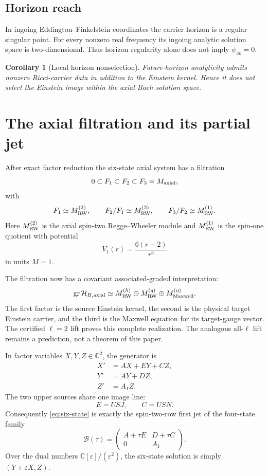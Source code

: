 \documentclass[11pt]{article}
\newtheorem{corollary}[theorem]{Corollary}
\theoremstyle{definition}
\theoremstyle{remark}
\newcommand{\C}{\mathbb C}
\begin{document}
\subsection{Horizon reach}

In ingoing Eddington--Finkelstein coordinates the carrier horizon is a regular
singular point.  For every nonzero real frequency its ingoing analytic
solution space is two-dimensional.  Thus horizon regularity alone does not
imply \(\psi_{ab}=0\).

\begin{corollary}[Local horizon nonselection]
Future-horizon analyticity admits nonzero Ricci-carrier data in addition to
the Einstein kernel.  Hence it does not select the Einstein image within the
axial Bach solution space.
\end{corollary}

\section{The axial filtration and its partial jet}
\label{sec:jet}

After exact factor reduction the six-state axial system has a filtration
\[
0\subset F_1\subset F_2\subset F_3=M_{\rm axial},
\]
with
\begin{equation}
\label{eq:filtration}
F_1\simeq M_{\rm RW}^{(2)},\qquad
F_2/F_1\simeq M_{\rm RW}^{(2)},\qquad
F_3/F_2\simeq M_{\rm RW}^{(1)}.
\end{equation}
Here \(M_{\rm RW}^{(2)}\) is the axial spin-two Regge--Wheeler module and
\(M_{\rm RW}^{(1)}\) is the spin-one quotient with potential
\[
V_1(r)=\frac{6(r-2)}{r^3}
\]
in units \(M=1\).

The filtration now has a covariant associated-graded interpretation:
\[
\operatorname{gr}\mathcal H_{B,\rm axial}
\simeq
M_{\rm RW}^{(h)}
\oplus M_{\rm RW}^{(q)}
\oplus M_{\rm Maxwell}^{(\eta)}.
\]
The first factor is the source Einstein kernel, the second is the physical
target Einstein carrier, and the third is the Maxwell equation for its
target-gauge vector.  The certified \(\ell=2\) lift proves this complete
realization.  The analogous all-\(\ell\) lift remains a prediction, not a
theorem of this paper.

In factor variables \(X,Y,Z\in\C^2\), the generator is
\begin{equation}
\label{eq:six-state}
\begin{aligned}
X'&=AX+EY+CZ,\\
Y'&=AY+DZ,\\
Z'&=A_1Z.
\end{aligned}
\end{equation}
The two upper sources share one image line:
\[
E=USJ,\qquad C=USN.
\]
Consequently \eqref{eq:six-state} is exactly the spin-two-row first jet of
the four-state family
\begin{equation}
\label{eq:four-state}
\mathcal B(\tau)=
\begin{pmatrix}
A+\tau E&D+\tau C\\
0&A_1
\end{pmatrix}.
\end{equation}
Over the dual numbers \(\C[\varepsilon]/(\varepsilon^2)\), the six-state
solution is simply \((Y+\varepsilon X,Z)\).
\end{document}
